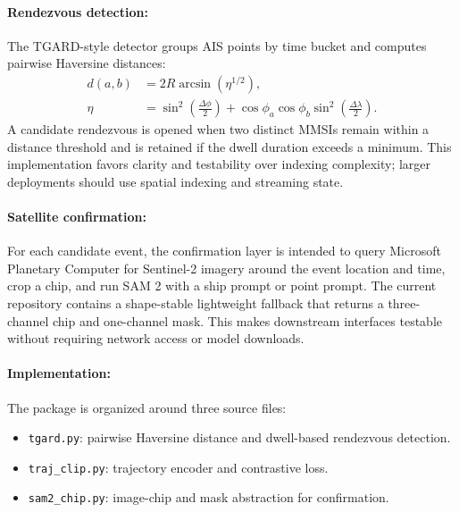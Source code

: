 \documentclass{article}
\begin{document}
\paragraph{Rendezvous detection:}

The TGARD-style detector groups AIS points by time bucket and computes pairwise Haversine distances:
\begin{equation}
\begin{aligned}
d(a,b)&=2R\arcsin\left(\eta^{1/2}\right),\\
\eta&=\sin^2\left(\frac{\Delta\phi}{2}\right)
+\cos\phi_a\cos\phi_b\sin^2\left(\frac{\Delta\lambda}{2}\right).
\end{aligned}
\end{equation}
A candidate rendezvous is opened when two distinct MMSIs remain within a distance threshold and is retained if the dwell duration exceeds a minimum. This implementation favors clarity and testability over indexing complexity; larger deployments should use spatial indexing and streaming state.

\paragraph{Satellite confirmation:}

For each candidate event, the confirmation layer is intended to query Microsoft Planetary Computer for Sentinel-2 imagery around the event location and time, crop a chip, and run SAM 2 with a ship prompt or point prompt. The current repository contains a shape-stable lightweight fallback that returns a three-channel chip and one-channel mask. This makes downstream interfaces testable without requiring network access or model downloads.

\paragraph{Implementation:}

The package is organized around three source files:
\begin{itemize}
  \item \texttt{tgard.py}: pairwise Haversine distance and dwell-based rendezvous detection.
  \item \texttt{traj\_clip.py}: trajectory encoder and contrastive loss.
  \item \texttt{sam2\_chip.py}: image-chip and mask abstraction for confirmation.
\end{itemize}
\end{document}
